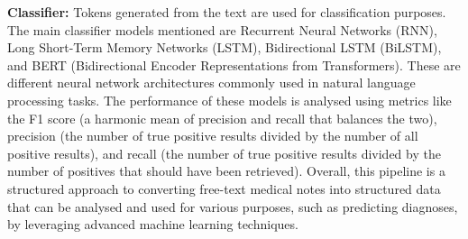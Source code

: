 \documentclass[journal,article,submit,pdftex,moreauthors]{Definitions/mdpi}
\begin{document}
\textbf{Classifier:}
Tokens generated from the text are used for classification purposes.
The main classifier models mentioned are Recurrent Neural Networks (RNN), Long Short-Term Memory Networks (LSTM), Bidirectional LSTM (BiLSTM), and BERT (Bidirectional Encoder Representations from Transformers). These are different neural network architectures commonly used in natural language processing tasks.
The performance of these models is analysed using metrics like the F1 score (a harmonic mean of precision and recall that balances the two), precision (the number of true positive results divided by the number of all positive results), and recall (the number of true positive results divided by the number of positives that should have been retrieved).
Overall, this pipeline is a structured approach to converting free-text medical notes into structured data that can be analysed and used for various purposes, such as predicting diagnoses, by leveraging advanced machine learning techniques.
\end{document}

